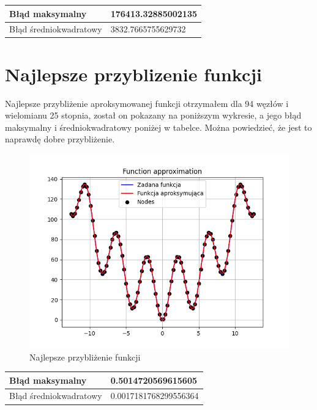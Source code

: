 \documentclass{article}
\begin{document}
\begin{table}[!ht]
    \centering
    \begin{tabular}{|l|l|}
    \hline
        Błąd maksymalny & 176413.32885002135    \\ \hline
        Błąd średniokwadratowy & 3832.7665755629732 \\ \hline
        
    \end{tabular}
\end{table}

\section{Najlepsze przyblizenie funkcji}

Najlepsze przybliżenie aproksymowanej funkcji otrzymałem dla 94 węzłów i wielomianu 25 stopnia, został on pokazany na poniższym wykresie, a jego błąd maksymalny i średniokwadratowy poniżej w tabelce. Można powiedzieć, że jest to naprawdę dobre przybliżenie.

\begin{figure}[H]
  \centering
  \begin{minipage}[b]{0.4\textwidth}
    \includegraphics[width=\textwidth]{best.png}
    \caption{Najlepsze przybliżenie funkcji}
  \end{minipage}
\end{figure}

\begin{table}[!ht]
    \centering
    \begin{tabular}{|l|l|}
    \hline
        Błąd maksymalny & 0.5014720569615605   \\ \hline
        Błąd średniokwadratowy & 0.0017181768299556364 \\ \hline
        
    \end{tabular}
\end{table}
\end{document}
